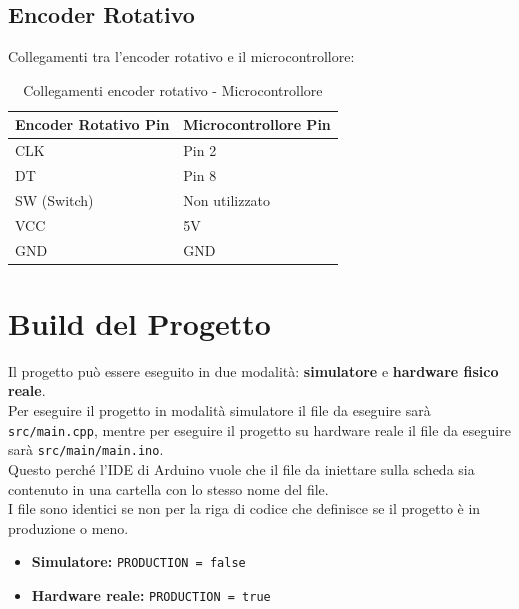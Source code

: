 \documentclass[a4paper, 12pt]{article}
\begin{document}
\subsection{Encoder Rotativo}
\label{subsec:setup-encoder}
Collegamenti tra l'encoder rotativo e il microcontrollore:

\begin{table}[H]
    \centering
    \caption{Collegamenti encoder rotativo - Microcontrollore}
    \label{tab:rotary-encoder-connections}
    \begin{tabular}{ll}
        \toprule
        \textbf{Encoder Rotativo Pin} & \textbf{Microcontrollore Pin} \\
        \midrule
        CLK                  & Pin 2                         \\
        DT                   & Pin 8                         \\
        SW (Switch)          & Non utilizzato                \\
        VCC                  & 5V                            \\
        GND                  & GND                           \\
        \bottomrule
    \end{tabular}
\end{table}

\section{Build del Progetto}
\label{sec:build}
Il progetto può essere eseguito in due modalità: \textbf{simulatore} e \textbf{hardware fisico reale}.\\
Per eseguire il progetto in modalità simulatore il file da eseguire sarà \texttt{src/main.cpp}, mentre per eseguire il progetto su hardware
reale il file da eseguire sarà \texttt{src/main/main.ino}.\\
Questo perché l'IDE di Arduino vuole che il file da iniettare sulla scheda sia contenuto in una cartella con lo stesso nome del file.\\
I file sono identici se non per la riga di codice che definisce se il progetto è in produzione o meno.
\begin{itemize}
    \item \textbf{Simulatore:} \texttt{PRODUCTION = false}
    \item \textbf{Hardware reale:} \texttt{PRODUCTION = true}
\end{itemize}
\end{document}
